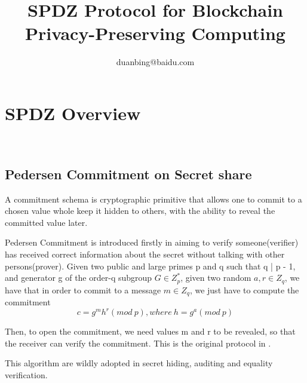 \documentclass[a4paper,11pt]{article}
\author{duanbing@baidu.com}
\title{SPDZ Protocol for Blockchain Privacy-Preserving Computing}
\begin{document}
\maketitle  
\tableofcontents


\section{SPDZ Overview}
  

\subsection{Pedersen Commitment on Secret share}

A commitment schema is cryptographic primitive that allows one to commit to a chosen value whole keep it hidden to others, with the ability to reveal the committed value later.

Pedersen Commitment is introduced firstly in \cite{pedersen1991non} aiming to verify someone(verifier) has received correct information about the secret without talking with other persons(prover). 
Given two public and large primes p and q such that q | p - 1, and generator g of the order-q subgroup $G \in  Z_p^{*}$, given two random $a, r \in Z_q$, we have that in order to commit to a message $m \in Z_q$, we just have to compute the commitment
\begin{equation}
c = g^m h^r (mod\ p), where\ h = g^a(mod\ p) 
\end{equation}

Then, to open the commitment, we need values m and r to be revealed, so that the receiver can verify the commitment.    This is the original protocol in  \cite{pedersen1991non}.  


 



 This algorithm are wildly adopted in secret hiding, auditing and equality verification.






\end{document}
